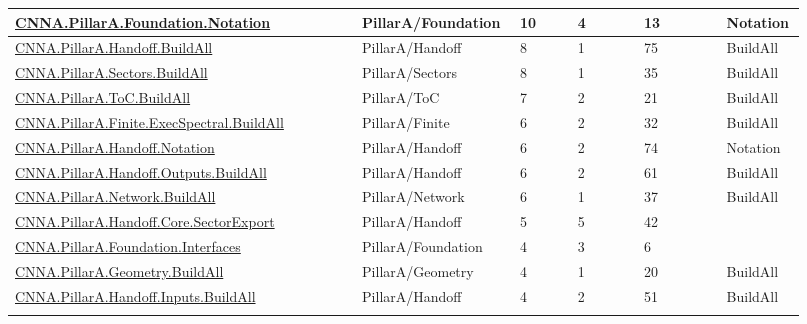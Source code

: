 \begin{longtable}{L{0.42\linewidth} L{0.16\linewidth} L{0.07\linewidth} L{0.08\linewidth} L{0.1\linewidth} L{0.09\linewidth}}
\href{run:repo_snapshot/CNNA/PillarA/Foundation/Notation.lean}{CNNA.\allowbreak{}PillarA.\allowbreak{}Foundation.\allowbreak{}Notation} & PillarA/\allowbreak{}Foundation & 10 & 4 & 13 & Notation\\
\hline
\addlinespace[0.24em]
\href{run:repo_snapshot/CNNA/PillarA/Handoff/BuildAll.lean}{CNNA.\allowbreak{}PillarA.\allowbreak{}Handoff.\allowbreak{}BuildAll} & PillarA/\allowbreak{}Handoff & 8 & 1 & 75 & BuildAll\\
\hline
\addlinespace[0.24em]
\href{run:repo_snapshot/CNNA/PillarA/Sectors/BuildAll.lean}{CNNA.\allowbreak{}PillarA.\allowbreak{}Sectors.\allowbreak{}BuildAll} & PillarA/\allowbreak{}Sectors & 8 & 1 & 35 & BuildAll\\
\hline
\addlinespace[0.24em]
\href{run:repo_snapshot/CNNA/PillarA/ToC/BuildAll.lean}{CNNA.\allowbreak{}PillarA.\allowbreak{}ToC.\allowbreak{}BuildAll} & PillarA/\allowbreak{}ToC & 7 & 2 & 21 & BuildAll\\
\hline
\addlinespace[0.24em]
\href{run:repo_snapshot/CNNA/PillarA/Finite/ExecSpectral/BuildAll.lean}{CNNA.\allowbreak{}PillarA.\allowbreak{}Finite.\allowbreak{}ExecSpectral.\allowbreak{}BuildAll} & PillarA/\allowbreak{}Finite & 6 & 2 & 32 & BuildAll\\
\hline
\addlinespace[0.24em]
\href{run:repo_snapshot/CNNA/PillarA/Handoff/Notation.lean}{CNNA.\allowbreak{}PillarA.\allowbreak{}Handoff.\allowbreak{}Notation} & PillarA/\allowbreak{}Handoff & 6 & 2 & 74 & Notation\\
\hline
\addlinespace[0.24em]
\href{run:repo_snapshot/CNNA/PillarA/Handoff/Outputs/BuildAll.lean}{CNNA.\allowbreak{}PillarA.\allowbreak{}Handoff.\allowbreak{}Outputs.\allowbreak{}BuildAll} & PillarA/\allowbreak{}Handoff & 6 & 2 & 61 & BuildAll\\
\hline
\addlinespace[0.24em]
\href{run:repo_snapshot/CNNA/PillarA/Network/BuildAll.lean}{CNNA.\allowbreak{}PillarA.\allowbreak{}Network.\allowbreak{}BuildAll} & PillarA/\allowbreak{}Network & 6 & 1 & 37 & BuildAll\\
\hline
\addlinespace[0.24em]
\href{run:repo_snapshot/CNNA/PillarA/Handoff/Core/SectorExport.lean}{CNNA.\allowbreak{}PillarA.\allowbreak{}Handoff.\allowbreak{}Core.\allowbreak{}SectorExport} & PillarA/\allowbreak{}Handoff & 5 & 5 & 42 & \\
\hline
\addlinespace[0.24em]
\href{run:repo_snapshot/CNNA/PillarA/Foundation/Interfaces.lean}{CNNA.\allowbreak{}PillarA.\allowbreak{}Foundation.\allowbreak{}Interfaces} & PillarA/\allowbreak{}Foundation & 4 & 3 & 6 & \\
\hline
\addlinespace[0.24em]
\href{run:repo_snapshot/CNNA/PillarA/Geometry/BuildAll.lean}{CNNA.\allowbreak{}PillarA.\allowbreak{}Geometry.\allowbreak{}BuildAll} & PillarA/\allowbreak{}Geometry & 4 & 1 & 20 & BuildAll\\
\hline
\addlinespace[0.24em]
\href{run:repo_snapshot/CNNA/PillarA/Handoff/Inputs/BuildAll.lean}{CNNA.\allowbreak{}PillarA.\allowbreak{}Handoff.\allowbreak{}Inputs.\allowbreak{}BuildAll} & PillarA/\allowbreak{}Handoff & 4 & 2 & 51 & BuildAll\\
\hline
\addlinespace[0.24em]
\end{longtable}
\normalsize
